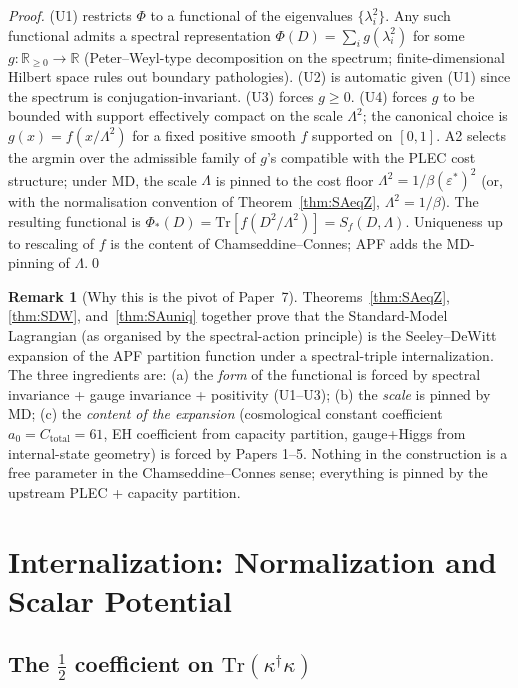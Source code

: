 \documentclass[11pt,a4paper]{article}
\theoremstyle{definition}
\newtheorem{remark}[theorem]{Remark}
\newcommand{\epsstar}{\varepsilon^{\ast}}
\newcommand{\Ctot}{C_{\mathrm{total}}}
\newcommand{\Tr}{\mathrm{Tr}}
\begin{document}
\begin{proof}
(U1) restricts $\Phi$ to a functional of the eigenvalues $\{\lambda_i^2\}$.  Any such functional admits a spectral representation $\Phi(D)=\sum_i g(\lambda_i^2)$ for some $g:\mathbb{R}_{\geq 0}\to\mathbb{R}$ (Peter--Weyl-type decomposition on the spectrum; finite-dimensional Hilbert space rules out boundary pathologies).  (U2) is automatic given (U1) since the spectrum is conjugation-invariant.  (U3) forces $g\geq 0$.  (U4) forces $g$ to be bounded with support effectively compact on the scale $\Lambda^2$; the canonical choice is $g(x)=f(x/\Lambda^2)$ for a fixed positive smooth $f$ supported on $[0,1]$.  A2 selects the argmin over the admissible family of $g$'s compatible with the PLEC cost structure; under MD, the scale $\Lambda$ is pinned to the cost floor $\Lambda^2=1/\beta(\epsstar)^2$ (or, with the normalisation convention of Theorem~\ref{thm:SAeqZ}, $\Lambda^2=1/\beta$).  The resulting functional is $\Phi_*(D)=\Tr[f(D^2/\Lambda^2)]=S_f(D,\Lambda)$.  Uniqueness up to rescaling of $f$ is the content of Chamseddine--Connes; APF adds the MD-pinning of $\Lambda$.\qed
\end{proof}

\begin{remark}[Why this is the pivot of Paper~7]
Theorems~\ref{thm:SAeqZ}, \ref{thm:SDW}, and~\ref{thm:SAuniq} together prove that the Standard-Model Lagrangian (as organised by the spectral-action principle) is the Seeley--DeWitt expansion of the APF partition function under a spectral-triple internalization.  The three ingredients are:  (a) the \emph{form} of the functional is forced by spectral invariance + gauge invariance + positivity (U1--U3); (b) the \emph{scale} is pinned by MD; (c) the \emph{content of the expansion} (cosmological constant coefficient $a_0=\Ctot=61$, EH coefficient from capacity partition, gauge+Higgs from internal-state geometry) is forced by Papers 1--5.  Nothing in the construction is a free parameter in the Chamseddine--Connes sense; everything is pinned by the upstream PLEC + capacity partition.
\end{remark}

\section{Internalization: Normalization and Scalar Potential}\label{sec:internal}
\setcounter{theorem}{0}

\subsection{The $\tfrac12$ coefficient on $\Tr(\kappa^\dagger\kappa)$}
\end{document}
